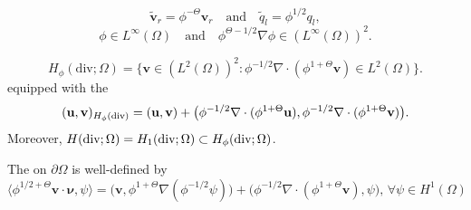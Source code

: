 \documentclass[usenames,dvipsnames,letterpaper,landscape,final]{slides}
\theoremstyle{definition}
\def\div{\nabla\cdot}
\def\Div{\text{\rm div}}
\begin{document}
\begin{myslide}

\newline
\begin{equation*}\label{eq:scaledVariables}
	\tilde{\mathbf{v}}_r = \phi^{-\Theta}\mathbf{v}_r
	\quad\text{and}\quad
	\tilde{q}_l = \phi^{1/2}q_l,
\end{equation*}
 \begin{equation*}\label{eq:phiboundness}
\phi \in L^{\infty}(\Omega) \quad \text{and} \quad
		  \phi^{\Theta - 1/2} \nabla \phi \in (L^{\infty}(\Omega))^2.
\end{equation*}

\begin{equation*}\label{eq:scaledHspace}
		  H_{\phi}(\text{div}; \Omega) = \Big\{ \mathbf{v} 
		  \in (L^2(\Omega))^2: \phi^{-1/2}\nabla \cdot (\phi^{1+\Theta} \mathbf{v})
		  \in L^2(\Omega) \Big\}.
\end{equation*}
		  equipped with the 
\begin{equation*}
(\mathbf{u},\mathbf{v})_{H_\phi(\Div)} = (\mathbf{u},\mathbf{v}) + \big(\phi^{-1/2}\div(\phi^{1+\Theta}\mathbf{u}),\phi^{-1/2}\div(\phi^{1+\Theta}\mathbf{v})\big).
\end{equation*}\vspace*{-20pt}\newline
Moreover, $H(\Div;\Omega) = H_1(\Div;\Omega) \subset H_\phi(\Div;\Omega)$.

\bigskip
The  on $\partial \Omega$ is well-defined by
		  \begin{equation*}\label{eq:scaledtraceoperator}
		  \langle \phi^{1/2+\Theta} \mathbf{v}\cdot \pmb{\nu}, \psi \rangle = \big(\mathbf{v}, \phi^{1+\Theta}\nabla(\phi^{-1/2}\psi)\big) + 
		  \big(\phi^{-1/2}\nabla \cdot (\phi^{1+\Theta}\mathbf{v}),\psi \big), \, \forall \psi \in H^1(\Omega)
\end{equation*}

\end{myslide}

%
%
\end{document}
